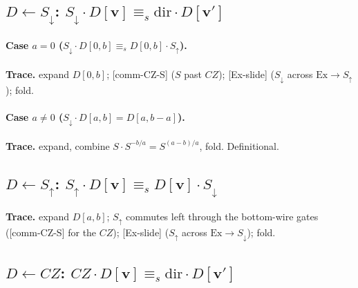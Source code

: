 \documentclass[a4paper]{article}
\newcommand{\lem}[1]{\textsf{[#1]}}      %
\begin{document}
\subsection{$D\leftarrow S_\downarrow$: \; $S_\downarrow\cdot D[\mathbf v]\equiv_s \mathrm{dir}\cdot D[\mathbf v']$}
\paragraph{Case $a=0$ \;($S_\downarrow\cdot D[0,b]\equiv_s D[0,b]\cdot S_\uparrow$).}\label{sub:sd0b}
\begin{center}\end{center}
\textbf{Trace.} expand $D[0,b]$; \lem{comm-CZ-S} ($S$ past $CZ$); \lem{Ex-slide} ($S_\downarrow$ across $\mathrm{Ex}\to S_\uparrow$); fold.

\paragraph{Case $a\neq0$ \;($S_\downarrow\cdot D[a,b]=D[a,b-a]$).}
\begin{center}\end{center}
\textbf{Trace.} expand, combine $S\cdot S^{-b/a}=S^{(a-b)/a}$, fold. Definitional.

\subsection{$D\leftarrow S_\uparrow$: \; $S_\uparrow\cdot D[\mathbf v]\equiv_s D[\mathbf v]\cdot S_\downarrow$}
\begin{center}\end{center}
\textbf{Trace.} expand $D[a,b]$; $S_\uparrow$ commutes left through the bottom-wire gates (\lem{comm-CZ-S} for the $CZ$); \lem{Ex-slide} ($S_\uparrow$ across $\mathrm{Ex}\to S_\downarrow$); fold.

\subsection{$D\leftarrow CZ$: \; $CZ\cdot D[\mathbf v]\equiv_s \mathrm{dir}\cdot D[\mathbf v']$}
\end{document}

